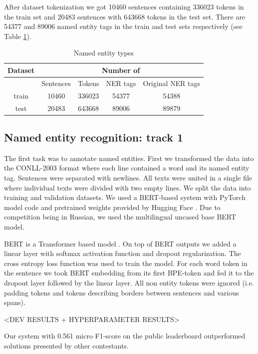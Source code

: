 \documentclass{dialogue}
\begin{document}
	After dataset tokenization we got 10460 sentences containing 336023 tokens in the train set and 20483 sentences with 643668 tokens in the test set. There are 54377 and 89006 named entity tags in the train and test sets respectively (see Table \ref{tab:tokenization}).
	
	\begin{table}[bth]
		\centering
		\begin{tabular}{c|c|c|c|c}
			\hline
			\multicolumn{1}{c|}{Dataset} &
			\multicolumn{4}{c}{Number of} \\  \hline
			& Sentences& Tokens & NER tags & Original NER tags\\ \hline
			train & 10460 & 336023 & 54377 & 54388\\ \hline
			test & 20483 & 643668 & 89006 & 89879\\ \hline
		\end{tabular}
		\caption{Named entity types}
		\label{tab:tokenization}
	\end{table}
	
	\subsection{Named entity recognition: track 1}
	The first task was to annotate named entities. First we transformed the data into the CONLL-2003 format where each line contained a word and its named entity tag. Sentences were separated with newlines. All texts were united in a single file where individual texts were divided with two empty lines. We split the data into training and validation datasets. We used a BERT-based system \cite{bert} with PyTorch model code and pretrained weights provided by Hugging Face \cite{Wolf2019HuggingFacesTS}. Due to competition being in Russian, we used the multilingual uncased base BERT model.
	
	BERT is a Transformer based model \cite{attention}. On top of BERT outputs we added a linear layer with softmax activation function and dropout regularization. The cross entropy loss function was used to train the model. For each word token in the sentence we took BERT embedding from its first BPE-token and fed it to the dropout layer followed by the linear layer. All non entity tokens were ignored (i.e. padding tokens and tokens describing borders between sentences and various spans).
	
	<DEV RESULTS + HYPERPARAMETER RESULTS>
	
	Our system with 0.561 micro F1-score on the public leaderboard outperformed solutions presented by other contestants.
	
\end{document}
